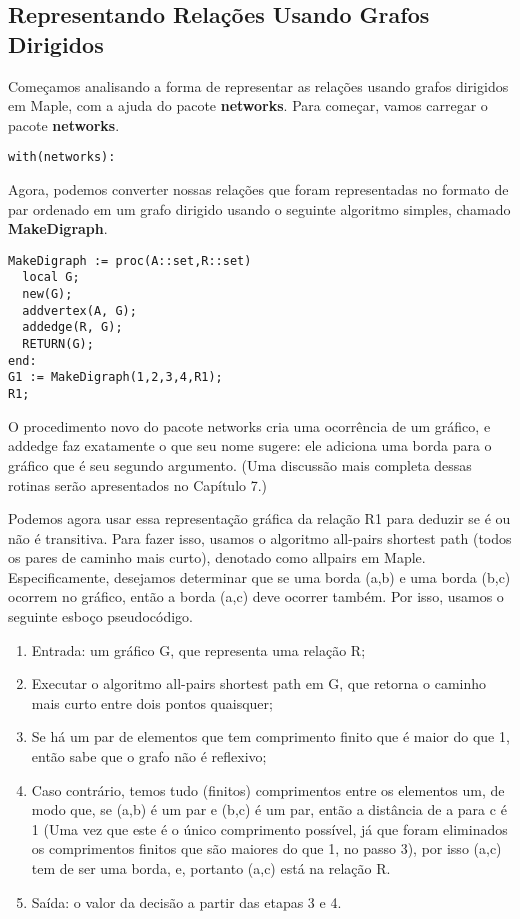 \documentclass[a4paper]{article}
\begin{document}
\subsection{Representando Relações Usando Grafos Dirigidos}
Começamos analisando a forma de representar as relações usando grafos dirigidos em Maple, com a ajuda do pacote \textbf{networks}. Para começar, vamos carregar o pacote \textbf{networks}.

\begin{lstlisting}
with(networks):
\end{lstlisting}

Agora, podemos converter nossas relações que foram representadas no formato de par ordenado em um grafo dirigido usando o seguinte algoritmo simples, chamado \textbf{MakeDigraph}.

\begin{lstlisting}
MakeDigraph := proc(A::set,R::set)
  local G;
  new(G);
  addvertex(A, G);
  addedge(R, G);
  RETURN(G);
end:
G1 := MakeDigraph(1,2,3,4,R1);
R1;
\end{lstlisting}

O procedimento novo do pacote networks cria uma ocorrência de um gráfico, e addedge faz exatamente o que seu nome sugere: ele adiciona uma borda para o gráfico que é seu segundo argumento. (Uma discussão mais completa dessas rotinas serão apresentados no Capítulo 7.)

Podemos agora usar essa representação gráfica da relação R1 para deduzir se é ou não é transitiva. Para fazer isso, usamos o algoritmo all-pairs shortest path (todos os pares de caminho mais curto), denotado como allpairs em Maple. Especificamente, desejamos determinar que se uma borda (a,b) e uma borda (b,c) ocorrem no gráfico, então a borda (a,c) deve ocorrer também. Por isso, usamos o seguinte esboço pseudocódigo.

\begin{enumerate}
\item{Entrada: um gráfico G, que representa uma relação R;}
\item{Executar o algoritmo all-pairs shortest path em G, que retorna o caminho mais curto entre dois pontos quaisquer;}
\item{Se há um par de elementos que tem comprimento finito que é maior do que 1, então sabe que o grafo não é reflexivo;}
\item{Caso contrário, temos tudo (finitos) comprimentos entre os elementos um, de modo que, se (a,b) é um par e (b,c) é um par, então a distância de a para c é 1 (Uma vez que este é o único comprimento possível, já que foram eliminados os comprimentos finitos que são maiores do que 1, no passo 3), por isso (a,c) tem de ser uma borda, e, portanto (a,c) está na relação R.}
\item{Saída: o valor da decisão a partir das etapas 3 e 4.}
\end{enumerate}
\end{document}
